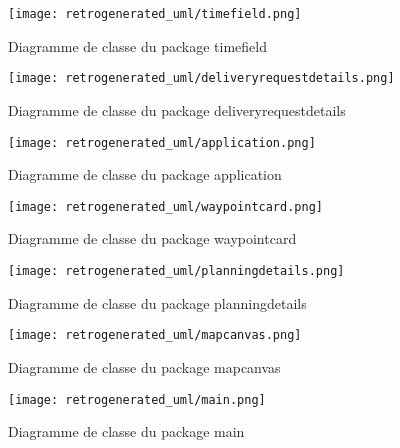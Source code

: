 \begin{figure}[h!]
    		\begin{center}
      			\texttt{[image: retrogenerated\_uml/timefield.png]}
      			\caption{Diagramme de classe du package timefield}
    		\end{center}
  	\end{figure}
\begin{figure}[h!]
    		\begin{center}
      			\texttt{[image: retrogenerated\_uml/deliveryrequestdetails.png]}
      			\caption{Diagramme de classe du package deliveryrequestdetails}
    		\end{center}
  	\end{figure}
\begin{figure}[h!]
    		\begin{center}
      			\texttt{[image: retrogenerated\_uml/application.png]}
      			\caption{Diagramme de classe du package application}
    		\end{center}
  	\end{figure}
\begin{figure}[h!]
    		\begin{center}
      			\texttt{[image: retrogenerated\_uml/waypointcard.png]}
      			\caption{Diagramme de classe du package waypointcard}
    		\end{center}
  	\end{figure}
\begin{figure}[h!]
    		\begin{center}
      			\texttt{[image: retrogenerated\_uml/planningdetails.png]}
      			\caption{Diagramme de classe du package planningdetails}
    		\end{center}
  	\end{figure}
\begin{figure}[h!]
    		\begin{center}
      			\texttt{[image: retrogenerated\_uml/mapcanvas.png]}
      			\caption{Diagramme de classe du package mapcanvas}
    		\end{center}
  	\end{figure}
\begin{figure}[h!]
    		\begin{center}
      			\texttt{[image: retrogenerated\_uml/main.png]}
      			\caption{Diagramme de classe du package main}
    		\end{center}
  	\end{figure}
